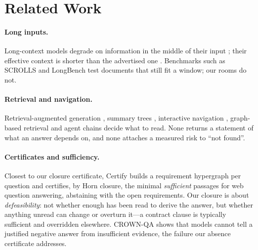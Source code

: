 \documentclass[11pt]{article}
\begin{document}
\section{Related Work}
\label{sec:related}

\paragraph{Long inputs.} Long-context models degrade on information in the middle of their input \citep{liu2024lost}; their effective context is shorter than the advertised one \citep{hsieh2024ruler,kuratov2024babilong,kamradt2023needle}. Benchmarks such as SCROLLS and LongBench \citep{shaham2022scrolls,bai2024longbench} test documents that still fit a window; our rooms do not.

\paragraph{Retrieval and navigation.} Retrieval-augmented generation \citep{lewis2020rag,karpukhin2020dpr,khattab2020colbert}, summary trees \citep{sarthi2024raptor}, interactive navigation \citep{chen2023memwalker,lee2024readagent,pageindex2025}, graph-based retrieval \citep{edge2024graphrag,gutierrez2024hipporag} and agent chains \citep{zhang2024chainofagents} decide what to read. None returns a statement of what an answer depends on, and none attaches a measured risk to ``not found''.

\paragraph{Certificates and sufficiency.} Closest to our closure certificate, Certify \citep{zhang2026certify} builds a requirement hypergraph per question and certifies, by Horn closure, the minimal \emph{sufficient} passages for web question answering, abstaining with the open requirements. Our closure is about \emph{defeasibility}: not whether enough has been read to derive the answer, but whether anything unread can change or overturn it---a contract clause is typically sufficient and overridden elsewhere. CROWN-QA \citep{min2026crown} shows that models cannot tell a justified negative answer from insufficient evidence, the failure our absence certificate addresses.
\end{document}
